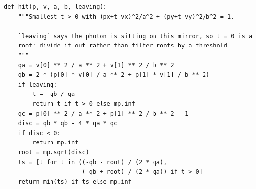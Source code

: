 \begin{verbatim}
def hit(p, v, a, b, leaving):
    """Smallest t > 0 with (px+t vx)^2/a^2 + (py+t vy)^2/b^2 = 1.

    `leaving` says the photon is sitting on this mirror, so t = 0 is a
    root: divide it out rather than filter roots by a threshold.
    """
    qa = v[0] ** 2 / a ** 2 + v[1] ** 2 / b ** 2
    qb = 2 * (p[0] * v[0] / a ** 2 + p[1] * v[1] / b ** 2)
    if leaving:
        t = -qb / qa
        return t if t > 0 else mp.inf
    qc = p[0] ** 2 / a ** 2 + p[1] ** 2 / b ** 2 - 1
    disc = qb * qb - 4 * qa * qc
    if disc < 0:
        return mp.inf
    root = mp.sqrt(disc)
    ts = [t for t in ((-qb - root) / (2 * qa),
                      (-qb + root) / (2 * qa)) if t > 0]
    return min(ts) if ts else mp.inf
\end{verbatim}
